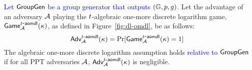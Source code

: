 \begin{assumption}\label{ass:aomdl}
\emph{\cite{NickRS21}}
\textcolor{blue}{Let $\mathsf{GroupGen}$ be a group generator that outputs $(\mathbb{G}, p, g)$.}
Let the advantage of an adversary $\mathcal{A}$ playing the $t$-algebraic one-more discrete logarithm game,
$\mathsf{Game}^{t\hbox{-}\mathsf{aomdl}}_{\mathcal{A}}(\kappa)$, as defined in Figure~\ref{fig:dl-omdl}, be as follows:
%
\[
  \textsf{Adv}^{\textrm{$t\hbox{-}\mathsf{aomdl}$}}_{\mathcal{A}}(\kappa) = \Pr[\mathsf{Game}^{t\hbox{-}\mathsf{aomdl}}_{\mathcal{A}}(\kappa) = 1]
\]
%
The algebraic one-more discrete logarithm assumption holds \textcolor{blue}{relative to $\mathsf{GroupGen}$} if for all PPT adversaries $\mathcal{A}$,
$\textsf{Adv}^{\textrm{$t\hbox{-}\mathsf{aomdl}$}}_{\mathcal{A}}(\kappa) $ is negligible.
\end{assumption}


